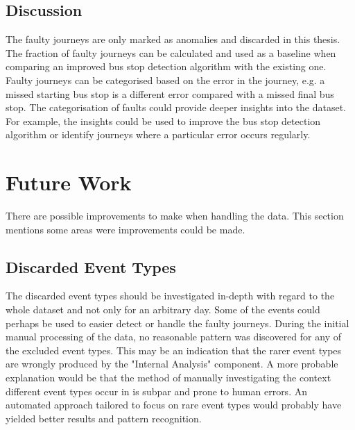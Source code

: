 \subsection{Discussion}
The faulty journeys are only marked as anomalies and discarded in this thesis.
The fraction of faulty journeys can be calculated and used as a baseline when comparing an improved bus stop detection algorithm with the existing one.
Faulty journeys can be categorised based on the error in the journey, e.g. a missed starting bus stop is a different error compared with a missed final bus stop.
The categorisation of faults could provide deeper insights into the dataset.
For example, the insights could be used to improve the bus stop detection algorithm or identify journeys where a particular error occurs regularly.

\section{Future Work}
There are possible improvements to make when handling the data.
This section mentions some areas were improvements could be made.

\subsection{Discarded Event Types}
The discarded event types should be investigated in-depth with regard to the whole dataset and not only for an arbitrary day.
Some of the events could perhaps be used to easier detect or handle the faulty journeys.
During the initial manual processing of the data, no reasonable pattern was discovered for any of the excluded event types.
This may be an indication that the rarer event types are wrongly produced by the "Internal Analysis" component.
A more probable explanation would be that the method of manually investigating the context different event types occur in is subpar and prone to human errors.
An automated approach tailored to focus on rare event types would probably have yielded better results and pattern recognition.